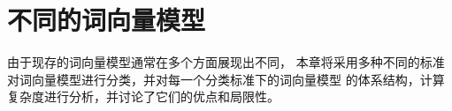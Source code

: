 \section{不同的词向量模型}
\label{sec:diff-models}

由于现存的词向量模型通常在多个方面展现出不同，
本章将采用多种不同的标准对词向量模型进行分类，并对每一个分类标准下的词向量模型
的体系结构，计算复杂度进行分析，并讨论了它们的优点和局限性。




